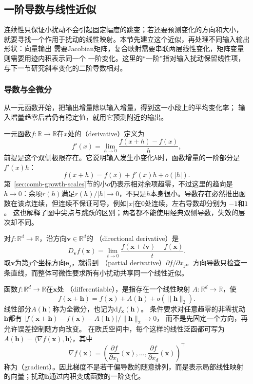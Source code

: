 \subsection{一阶导数与线性近似}
\label{sec:analysis-vector-chain-matrix-calculus}
\label{sec:analysis-derivatives-linear-approximation}
连续性只保证小扰动不会引起固定幅度的跳变；若还要预测变化的方向和大小，
就要寻找一个作用于扰动的线性映射。本节先建立这个近似，再处理不同输入输出形状：向量输出
需要Jacobian矩阵，复合映射需要串联两层线性变化，矩阵变量则需要用迹内积表示同一个
一阶变化。这里的“一阶”指对输入扰动保留线性项，与下一节研究斜率变化的二阶导数相对。

\subsubsection{导数与全微分}

从一元函数开始，把输出增量除以输入增量，得到这一小段上的平均变化率；
输入增量趋零后若仍有稳定值，就用它预测附近的输出。

一元函数$f:\mathbb{R}\to\mathbb{R}$在$x$处的（derivative）定义为
\[   f'(x)=\lim_{h\to0}\frac{f(x+h)-f(x)}{h}, \]
前提是这个双侧极限存在。它说明输入发生小变化$h$时，函数增量的一阶部分是$f'(x)h$：
\begin{equation}
  f(x+h)=f(x)+f'(x)h+o(|h|).
\label{eq:analysis-scalar-first-order}
\end{equation}
第~\ref{sec:comb-growth-scales}节的小$o$仍表示相对余项趋零，不过这里的趋向是$h\to0$：余项$r(h)$满足$r(h)/|h|\to0$，不只是$h$本身很小。导数存在必然推出函数在该点连续，但连续不保证可导，例如$|x|$在$0$处连续，左右导数却分别为 $-1$和$1$。
这也解释了图中尖点与跳跃的区别；两者都不能使用经典双侧导数，失效的层次却不同。

对$f:\mathbb{R}^d\to\mathbb{R}$，沿方向$\bm{v}\in\mathbb{R}^d$的
（directional derivative）是
\[   D_{\bm{v}}f(\bm{x})   =   \lim_{t\to0}   \frac{f(\bm{x}+t\bm{v})-f(\bm{x})}{t}. \]
取$\bm{v}$为第$j$个坐标方向$\bm{e}_j$，就得到
（partial derivative）$\partial f/\partial x_j$。方向导数只检查一条直线，而整体可微性要求所有小扰动共享同一个线性近似。

函数$f:\mathbb{R}^d\to\mathbb{R}$在$\bm{x}$处
（differentiable），是指存在一个线性映射 $A:\mathbb{R}^d\to\mathbb{R}$，使
\begin{equation}
  f(\bm{x}+\bm{h})
  =
  f(\bm{x})+A(\bm{h})+o(\lVert\bm{h}\rVert_2).
\label{eq:analysis-total-differentiability}
\end{equation}
线性部分$A(\bm h)$称为全微分，也记为$\mathrm df_{\bm x}(\bm h)$。
条件要求对任意趋零的非零扰动$\bm h$都有
$|f(\bm x+\bm h)-f(\bm x)-A(\bm h)|/\lVert\bm h\rVert_2\to0$，
而不是先固定一个方向，再允许误差控制随方向改变。
在欧氏空间中，每个这样的线性泛函都可写为 $A(\bm{h})=\langle\nabla f(\bm{x}),\bm{h}\rangle$，其中
\[   \nabla f(\bm{x})   =   \left(     \frac{\partial f}{\partial x_1}(\bm{x}),\ldots,     \frac{\partial f}{\partial x_d}(\bm{x})   \right)^{\top} \]
称为（gradient）。因此梯度不是若干偏导数的随意排列，而是表示局部线性映射的向量；扰动$\bm{h}$通过内积变成函数的一阶变化。

